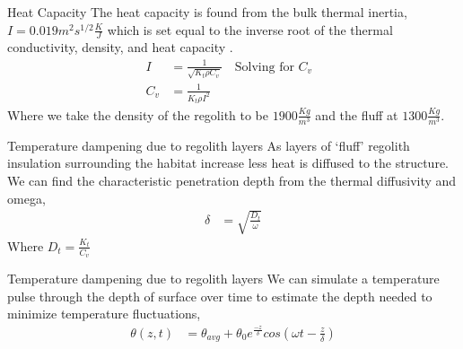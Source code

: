 \documentclass{beamer}
\begin{document}
\begin{frame}{Heat Capacity}
The heat capacity is found from the bulk thermal inertia, $I = 0.019 m^2 s^{1/2} \frac{K}{J}$ which is set equal to the inverse root of the thermal conductivity, density, and heat capacity \cite{Racca}. 
\begin{align*}
I & = \frac{1}{\sqrt{K_t \rho C_v}} \quad \text{Solving for $C_v$	}\\
C_v & = \frac{1}{K_t \rho I^2}
\end{align*}
Where we take the density of the regolith to be $ 1900 \frac{Kg}{m^3} $  and the fluff at $1300\frac{Kg}{m^3} $\cite{Malla}.
\end{frame}






%
% 



  
\begin{frame}{Temperature dampening due to regolith layers }
As layers of `fluff' regolith insulation surrounding the habitat increase less heat is diffused to the structure.  
We can find the characteristic penetration depth from the thermal diffusivity and omega,
\begin{align*}
\delta & = \sqrt{\frac{D_t}{\omega}}
\end{align*}
Where $D_t = \frac{K_t}{C_v}$

\end{frame}




  
\begin{frame}{Temperature dampening due to regolith layers }
We can simulate a temperature pulse through the depth of surface over time to estimate the depth needed to minimize temperature fluctuations,
\begin{align*}
\theta(z,t) & = \theta_{avg}+\theta_0 e^{\frac{-z}{\delta}} cos(\omega t- \frac{z}{\delta})
\end{align*}

\end{frame}
\end{document}
